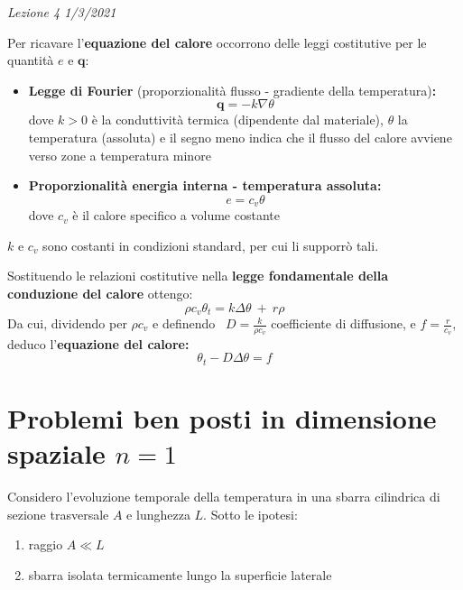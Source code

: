 \documentclass[10pt,a4paper,twoside,openright]{book}
\begin{document}
\textit{Lezione 4 1/3/2021}

Per ricavare l'\textbf{equazione del calore} occorrono delle leggi costitutive per le quantità $\displaystyle e$ e $\displaystyle \mathbf{q}$:
\begin{itemize}
\item \textbf{Legge di Fourier }(proporzionalità flusso - gradiente della temperatura)\textbf{:}\begin{equation*}
\mathbf{q} =-k\nabla \theta 
\end{equation*}dove $\displaystyle k >0$ è la conduttività termica (dipendente dal materiale), $\displaystyle \theta $ la temperatura (assoluta) e il segno meno indica che il flusso del calore avviene verso zone a temperatura minore
\item \textbf{Proporzionalità energia interna - temperatura assoluta:}\begin{equation*}
e=c_{v} \theta 
\end{equation*}dove $\displaystyle c_{v}$ è il calore specifico a volume costante
\end{itemize}



$\displaystyle k$ e $\displaystyle c_{v}$ sono costanti in condizioni standard, per cui li supporrò tali.

Sostituendo le relazioni costitutive nella \textbf{legge fondamentale della conduzione del calore} ottengo:
\begin{equation*}
\rho c_{v} \theta _{t} =k\Delta \theta \ +\ r\rho 
\end{equation*}
Da cui, dividendo per $\displaystyle \rho c_{v}$ e definendo \ $\displaystyle D=\frac{k}{\rho c_{v}}$ coefficiente di diffusione, e $\displaystyle {\textstyle f=\frac{r}{c_{v}}}$, deduco l'\textbf{equazione del calore:}
\begin{equation*}
\boxed{\theta _{t} -D\Delta \theta =f}
\end{equation*}

\section{Problemi ben posti in dimensione spaziale \texorpdfstring{$n=1$}{n=1}}

Considero l'evoluzione temporale della temperatura in una sbarra cilindrica di sezione trasversale $\displaystyle A$ e lunghezza $\displaystyle L$. Sotto le ipotesi:
\begin{enumerate}
\item  raggio $\displaystyle A\ll L$
\item  sbarra isolata termicamente lungo la superficie laterale
\end{enumerate}
\end{document}
